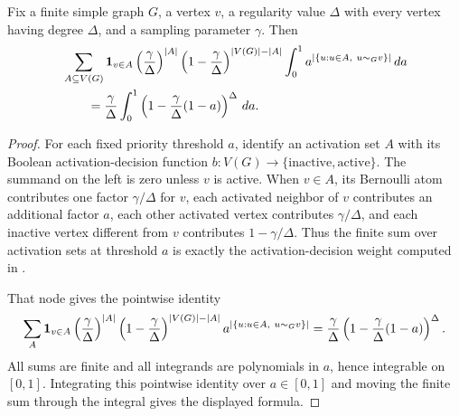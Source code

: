 \begin{helper}
Fix a finite simple graph $G$, a vertex $v$, a regularity value $\Delta$ with
every vertex having degree $\Delta$, and a sampling parameter $\gamma$.  Then
\[
\begin{aligned}
&\sum_{A\subseteq V(G)}{\bf 1}_{v\in A}
\left(\frac{\gamma}{\Delta}\right)^{|A|}
\left(1-\frac{\gamma}{\Delta}\right)^{|V(G)|-|A|}
\int_0^1 a^{|\{u:u\in A,\ u\sim_G v\}|}\,da  \\
&\qquad =
\frac{\gamma}{\Delta}
\int_0^1
\left(1-\frac{\gamma}{\Delta}(1-a)\right)^\Delta\,da .
\end{aligned}
\]
\end{helper}
\begin{proof}
For each fixed priority threshold $a$, identify an activation set $A$ with
its Boolean activation-decision function $b:V(G)\to\{\mathrm{inactive},
\mathrm{active}\}$.  The summand on the left is zero unless $v$ is active.
When $v\in A$, its Bernoulli atom contributes one factor $\gamma/\Delta$ for
$v$, each activated neighbor of $v$ contributes an additional factor $a$, each
other activated vertex contributes $\gamma/\Delta$, and each inactive vertex
different from $v$ contributes $1-\gamma/\Delta$.  Thus the finite sum over
activation sets at threshold $a$ is exactly the activation-decision weight
computed in .

That node gives the pointwise identity
\[
\sum_A{\bf 1}_{v\in A}
\left(\frac{\gamma}{\Delta}\right)^{|A|}
\left(1-\frac{\gamma}{\Delta}\right)^{|V(G)|-|A|}
a^{|\{u:u\in A,\ u\sim_G v\}|}
=
\frac{\gamma}{\Delta}
\left(1-\frac{\gamma}{\Delta}(1-a)\right)^\Delta .
\]
All sums are finite and all integrands are polynomials in $a$, hence
integrable on $[0,1]$.  Integrating this pointwise identity over $a\in[0,1]$
and moving the finite sum through the integral gives the displayed formula.
\end{proof}
